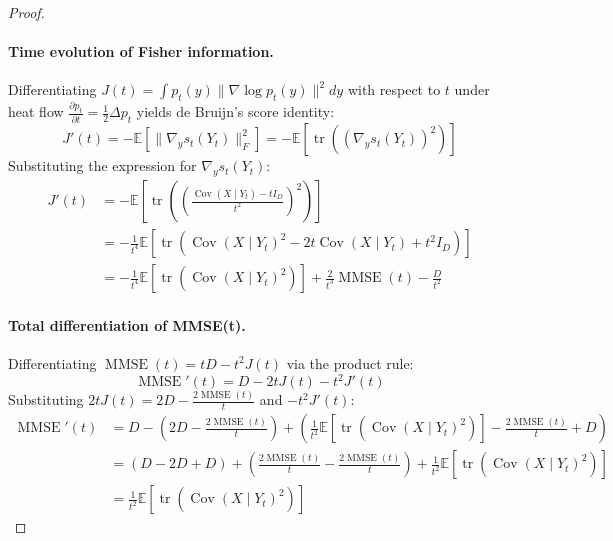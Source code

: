 \documentclass{article}
\theoremstyle{plain}
\theoremstyle{definition}
\theoremstyle{remark}
\begin{document}
\begin{proof}
    \paragraph{Time evolution of Fisher information.}
    Differentiating $J(t) = \int p_t(y) \|\nabla \log p_t(y)\|^2 dy$ with respect to $t$ under heat flow $\frac{\partial p_t}{\partial t} = \frac{1}{2} \Delta p_t$ yields de Bruijn's score identity:
    $$ J'(t) = -\mathbb{E}\left[ \|\nabla_y s_t(Y_t)\|_F^2 \right] = -\mathbb{E}\left[ \operatorname{tr}\left( (\nabla_y s_t(Y_t))^2 \right) \right] $$
    Substituting the expression for $\nabla_y s_t(Y_t)$:
    \begin{align*}
    J'(t) &= -\mathbb{E}\left[ \operatorname{tr}\left( \left(\frac{\operatorname{Cov}(X \mid Y_t) - t I_D}{t^2}\right)^2 \right) \right] \\
    &= -\frac{1}{t^4} \mathbb{E}\left[ \operatorname{tr}\left( \operatorname{Cov}(X \mid Y_t)^2 - 2t \operatorname{Cov}(X \mid Y_t) + t^2 I_D \right) \right] \\
    &= -\frac{1}{t^4} \mathbb{E}\left[ \operatorname{tr}\left( \operatorname{Cov}(X \mid Y_t)^2 \right) \right] + \frac{2}{t^3} \operatorname{MMSE}(t) - \frac{D}{t^2}
    \end{align*}
    
    \paragraph{Total differentiation of MMSE(t).}
    Differentiating $\operatorname{MMSE}(t) = t D - t^2 J(t)$ via the product rule:
    $$ \operatorname{MMSE}'(t) = D - 2t J(t) - t^2 J'(t) $$
    Substituting $2t J(t) = 2D - \frac{2\operatorname{MMSE}(t)}{t}$ and $-t^2 J'(t)$:
    \begin{align*}
    \operatorname{MMSE}'(t) &= D - \left( 2D - \frac{2\operatorname{MMSE}(t)}{t} \right) + \left( \frac{1}{t^2} \mathbb{E}\left[\operatorname{tr}\left(\operatorname{Cov}(X \mid Y_t)^2\right)\right] - \frac{2\operatorname{MMSE}(t)}{t} + D \right) \\
    &= (D - 2D + D) + \left( \frac{2\operatorname{MMSE}(t)}{t} - \frac{2\operatorname{MMSE}(t)}{t} \right) + \frac{1}{t^2} \mathbb{E}\left[ \operatorname{tr}\left( \operatorname{Cov}(X \mid Y_t)^2 \right) \right] \\
    &= \frac{1}{t^2} \mathbb{E}\left[ \operatorname{tr}\left( \operatorname{Cov}(X \mid Y_t)^2 \right) \right]
    \end{align*}
    \end{proof}
\end{document}

